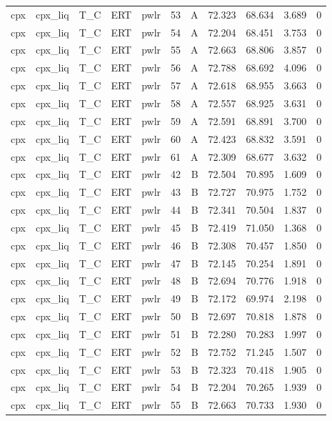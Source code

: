 \begin{longtable}{lllllrrrrrr}
cpx & cpx\_liq & T\_C & ERT & pwlr & 53 & A & 72.323 & 68.634 & 3.689 & 0 \\
cpx & cpx\_liq & T\_C & ERT & pwlr & 54 & A & 72.204 & 68.451 & 3.753 & 0 \\
cpx & cpx\_liq & T\_C & ERT & pwlr & 55 & A & 72.663 & 68.806 & 3.857 & 0 \\
cpx & cpx\_liq & T\_C & ERT & pwlr & 56 & A & 72.788 & 68.692 & 4.096 & 0 \\
cpx & cpx\_liq & T\_C & ERT & pwlr & 57 & A & 72.618 & 68.955 & 3.663 & 0 \\
cpx & cpx\_liq & T\_C & ERT & pwlr & 58 & A & 72.557 & 68.925 & 3.631 & 0 \\
cpx & cpx\_liq & T\_C & ERT & pwlr & 59 & A & 72.591 & 68.891 & 3.700 & 0 \\
cpx & cpx\_liq & T\_C & ERT & pwlr & 60 & A & 72.423 & 68.832 & 3.591 & 0 \\
cpx & cpx\_liq & T\_C & ERT & pwlr & 61 & A & 72.309 & 68.677 & 3.632 & 0 \\
cpx & cpx\_liq & T\_C & ERT & pwlr & 42 & B & 72.504 & 70.895 & 1.609 & 0 \\
cpx & cpx\_liq & T\_C & ERT & pwlr & 43 & B & 72.727 & 70.975 & 1.752 & 0 \\
cpx & cpx\_liq & T\_C & ERT & pwlr & 44 & B & 72.341 & 70.504 & 1.837 & 0 \\
cpx & cpx\_liq & T\_C & ERT & pwlr & 45 & B & 72.419 & 71.050 & 1.368 & 0 \\
cpx & cpx\_liq & T\_C & ERT & pwlr & 46 & B & 72.308 & 70.457 & 1.850 & 0 \\
cpx & cpx\_liq & T\_C & ERT & pwlr & 47 & B & 72.145 & 70.254 & 1.891 & 0 \\
cpx & cpx\_liq & T\_C & ERT & pwlr & 48 & B & 72.694 & 70.776 & 1.918 & 0 \\
cpx & cpx\_liq & T\_C & ERT & pwlr & 49 & B & 72.172 & 69.974 & 2.198 & 0 \\
cpx & cpx\_liq & T\_C & ERT & pwlr & 50 & B & 72.697 & 70.818 & 1.878 & 0 \\
cpx & cpx\_liq & T\_C & ERT & pwlr & 51 & B & 72.280 & 70.283 & 1.997 & 0 \\
cpx & cpx\_liq & T\_C & ERT & pwlr & 52 & B & 72.752 & 71.245 & 1.507 & 0 \\
cpx & cpx\_liq & T\_C & ERT & pwlr & 53 & B & 72.323 & 70.418 & 1.905 & 0 \\
cpx & cpx\_liq & T\_C & ERT & pwlr & 54 & B & 72.204 & 70.265 & 1.939 & 0 \\
cpx & cpx\_liq & T\_C & ERT & pwlr & 55 & B & 72.663 & 70.733 & 1.930 & 0 \\

\end{longtable}

